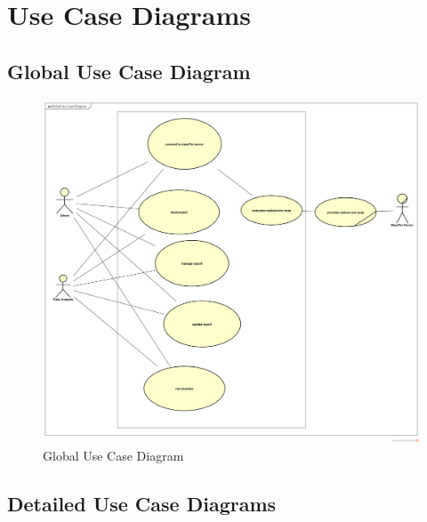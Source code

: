 \documentclass[12pt]{article}
\begin{document}
	\section{Use Case Diagrams}
	\subsection{Global Use Case Diagram}
	\clearpage
	\newpage
	\begin{figure}[h]
		\centering
		\includegraphics[width=1.0\textwidth]{GlobalUseCaseDiagram.png}
		\caption{Global Use Case Diagram}
		
	\end{figure}

\clearpage
\newpage


	\subsection{Detailed Use Case Diagrams}
	\clearpage
	\newpage
\end{document}
